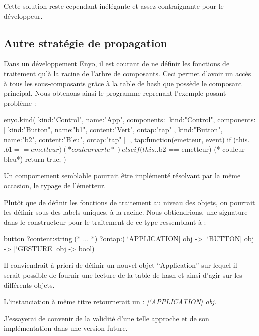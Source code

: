 \documentclass[11pt,a4paper]{report}
\begin{document}
Cette solution reste cependant inélégante et assez contraignante pour le développeur.

\subsection{Autre stratégie de propagation}\label{sub:event_amel}

Dans un développement Enyo, il est courant de ne définir les fonctions de traitement qu'à la racine de l'arbre
de composants. Ceci permet d'avoir un accès à tous les sous-composants grâce à la table de hash que possède
le composant principal. Nous obtenons ainsi le programme reprenant l'exemple posant problème :
\begin{JavaScript}
  enyo.kind({
    kind:"Control",
    name:"App",
    components:[
      {
        kind:"Control",
        components:[
          {kind:"Button", name:"b1", content:"Vert",
            ontap:"tap"
          },
          {kind:"Button", name:"b2", content:"Bleu",         
            ontap:"tap"
          }
        ]
      }
    ],
    tap:function(emetteur, event){
      if (this.$.b1 == emetteur){
        (* couleur verte *)
      } else if (this.$.b2 == emetteur){
        (* couleur bleu*)
      }
      return true;
    }
})
\end{JavaScript}

Un comportement semblable pourrait être implémenté résolvant par la même occasion, le typage de l'émetteur.

Plutôt que de définir les fonctions de traitement au niveau des objets, on pourrait les définir
sous des labels uniques, à la racine. Nous obtiendrions, une signature dans le constructeur
pour le traitement de ce type ressemblant à :
\begin{OCaml}
  button ?content:string
         (* ... *)
         ?ontap:([`APPLICATION] obj -> 
                 [`BUTTON] obj -> 
                 [`GESTURE] obj -> bool)
\end{OCaml}

Il conviendrait à priori de définir un nouvel objet ``Application'' sur lequel il serait possible de
fournir une lecture de la table de hash et ainsi d'agir sur les différents objets.

L'instanciation à même titre retournerait un : \emph{[`APPLICATION] obj}.

J'essayerai de convenir de la validité d'une telle approche et de son implémentation dans une 
version future.

\end{document}

